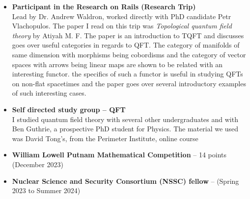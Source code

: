 \documentclass{curriculum-vitae}
\begin{document}
\begin{itemize}
    \item \textbf{Participant in the Research on Rails (Research Trip)}\\
    Lead by Dr. Andrew Waldron, worked directly with PhD candidate Petr Vlachopulos. The paper I read on this trip was \emph{Topological quantum field theory} by Atiyah M. F. The paper is an introduction to TQFT and discusses goes over useful categories in regards to QFT. The category of manifolds of same dimension with morphisms being cobordisms and the category of vector spaces with arrows being linear maps are shown to be related with an interesting functor. the specifics of such a functor is useful in studying QFTs on non-flat spacetimes and the paper goes over several introductory examples of such interesting cases. 
    \item \textbf{Self directed study group -- QFT}\\
    I studied quantum field theory with several other undergraduates and with Ben Guthrie, a prospective PhD student for Physics. The material we used was David Tong's, from the Perimeter Institute, online course
    \item \textbf{William Lowell Putnam Mathematical Competition} -- 14 points (December 2023)
    \item \textbf{Nuclear Science and Security Consortium (NSSC) fellow} -- (Spring 2023 to Summer 2024)
    
\end{itemize}
\end{document}
